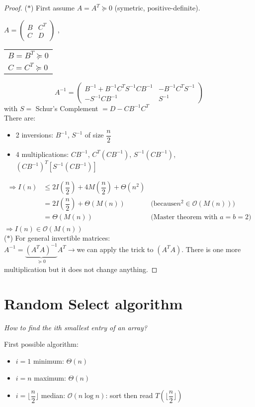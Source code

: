 \begin{proof}
($\ast$)  First assume $A=A^T\succcurlyeq 0$ (symetric, positive-definite).\\
\begin{center}
$A=\begin{pmatrix}
B & C^T\\
C & D
\end{pmatrix}$ \hspace*{1cm},\hspace*{1cm}
\begin{tabular}{l}
$B=B^T\succcurlyeq 0$\\
$C=C^T\succcurlyeq 0$
\end{tabular}
\end{center}
$$A^{-1}=\begin{pmatrix}
B^{-1}+B^{-1}C^TS^{-1}CB^{-1} & -B^{-1}C^TS^{-1}\\
-S^{-1}CB^{-1} & S^{-1}
\end{pmatrix}$$
with $S=$ Schur's Complement $=D-CB^{-1}C^T$\\
There are:
\begin{itemize}
\item 2 inversions: $B^{-1}$, $S^{-1}$ of size $\dfrac{n}{2}$
\item 4 multiplications: $CB^{-1}$, $C^T (CB^{-1})$, $S^{-1}(CB^{-1})$, $(CB^{-1})^T\left[S^{-1}(CB^{-1})\right]$
\end{itemize}
\begin{align*}
\Rightarrow I(n) &\leq 2I(\dfrac{n}{2})+4M(\dfrac{n}{2})+\Theta(n^2)&\\
&=2I\left(\dfrac{n}{2}\right)+\Theta(M(n))&\text{(because}n^2\in \mathcal{O}(M(n)))\\
&=\Theta(M(n))&\text{(Master theorem with } a=b=2)\\
\end{align*}
$\Rightarrow I(n)\in \mathcal{O}(M(n))$\\

($\ast$) For general invertible matrices:\\
\hspace*{2cm} $A^{-1}=\underbrace{(A^TA)^{-1}}\limits_{\succcurlyeq 0}A^T\rightarrow$we can apply the trick to $(A^TA)$. There is one more multiplication but it does not change anything.
\end{proof}

\section{Random Select algorithm}
\textit{How to find the ith smallest entry of an array?}
\begin{example}
\begin{leftbar}
First possible algorithm:
\begin{itemize}
\item $i=1$   minimum: $\Theta(n)$
\item $i=n$   maximum: $\Theta(n)$
\item $i=\lfloor \dfrac{n}{2}\rfloor$ median: $\mathcal{O}(n\log n)$: sort then read $T(\lfloor \dfrac{n}{2}\rfloor)$
\end{itemize}
\end{leftbar}
\end{example}

